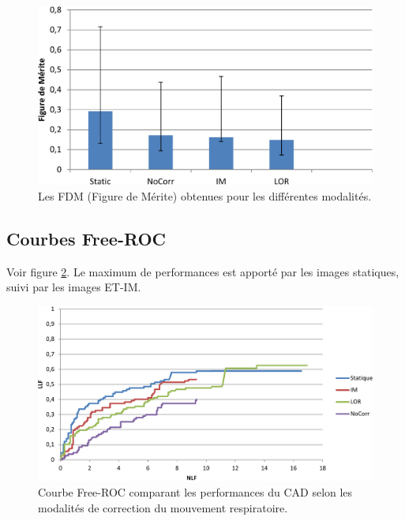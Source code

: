 \begin{figure}[h!]
 \begin{center}
   \includegraphics[width=15cm]{images/FOM_mod19}
 \end{center}
 \caption{ \label{lab:fom_mod19} Les FDM (Figure de Mérite) obtenues pour les différentes modalités.}
\end{figure}


\subsection{Courbes Free-ROC}

Voir figure \ref{lab:froc_mod19}.
Le maximum de performances est apporté par les images statiques, suivi par les images ET-IM.

\begin{figure}[h!]
 \begin{center}
   \includegraphics[width=15cm]{images/FROC_mod19}
 \end{center}
 \caption{ \label{lab:froc_mod19} Courbe Free-ROC comparant les performances du CAD selon les modalités de correction du mouvement respiratoire.}
\end{figure}


